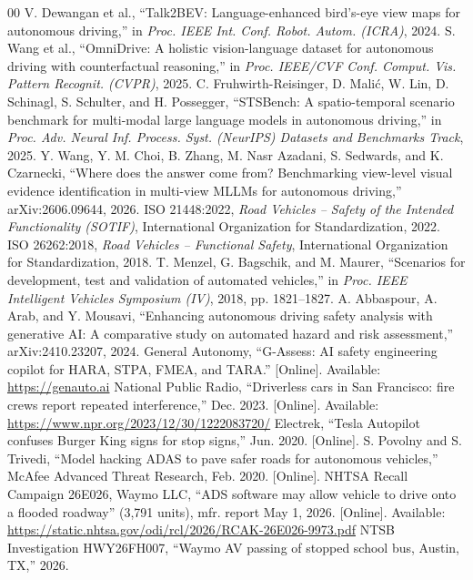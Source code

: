 \documentclass[conference]{IEEEtran}
\begin{document}
\begin{thebibliography}{00}
 V. Dewangan et al., ``Talk2BEV: Language-enhanced bird's-eye view maps for autonomous driving,'' in \emph{Proc. IEEE Int. Conf. Robot. Autom. (ICRA)}, 2024.
 S. Wang et al., ``OmniDrive: A holistic vision-language dataset for autonomous driving with counterfactual reasoning,'' in \emph{Proc. IEEE/CVF Conf. Comput. Vis. Pattern Recognit. (CVPR)}, 2025.
 C. Fruhwirth-Reisinger, D. Mali\'{c}, W. Lin, D. Schinagl, S. Schulter, and H. Possegger, ``STSBench: A spatio-temporal scenario benchmark for multi-modal large language models in autonomous driving,'' in \emph{Proc. Adv. Neural Inf. Process. Syst. (NeurIPS) Datasets and Benchmarks Track}, 2025.
 Y. Wang, Y. M. Choi, B. Zhang, M. Nasr Azadani, S. Sedwards, and K. Czarnecki, ``Where does the answer come from? Benchmarking view-level visual evidence identification in multi-view MLLMs for autonomous driving,'' arXiv:2606.09644, 2026.
 ISO 21448:2022, \emph{Road Vehicles -- Safety of the Intended Functionality (SOTIF)}, International Organization for Standardization, 2022.
 ISO 26262:2018, \emph{Road Vehicles -- Functional Safety}, International Organization for Standardization, 2018.
 T. Menzel, G. Bagschik, and M. Maurer, ``Scenarios for development, test and validation of automated vehicles,'' in \emph{Proc. IEEE Intelligent Vehicles Symposium (IV)}, 2018, pp. 1821--1827.
 A. Abbaspour, A. Arab, and Y. Mousavi, ``Enhancing autonomous driving safety analysis with generative AI: A comparative study on automated hazard and risk assessment,'' arXiv:2410.23207, 2024.
 General Autonomy, ``G-Assess: AI safety engineering copilot for HARA, STPA, FMEA, and TARA.'' [Online]. Available: \url{https://genauto.ai}
 National Public Radio, ``Driverless cars in San Francisco: fire crews report repeated interference,'' Dec. 2023. [Online]. Available: \url{https://www.npr.org/2023/12/30/1222083720/}
 Electrek, ``Tesla Autopilot confuses Burger King signs for stop signs,'' Jun. 2020. [Online].
 S. Povolny and S. Trivedi, ``Model hacking ADAS to pave safer roads for autonomous vehicles,'' McAfee Advanced Threat Research, Feb. 2020. [Online].
 NHTSA Recall Campaign 26E026, Waymo LLC, ``ADS software may allow vehicle to drive onto a flooded roadway'' (3,791 units), mfr. report May 1, 2026. [Online]. Available: \url{https://static.nhtsa.gov/odi/rcl/2026/RCAK-26E026-9973.pdf}
 NTSB Investigation HWY26FH007, ``Waymo AV passing of stopped school bus, Austin, TX,'' 2026.

\end{thebibliography}
\end{document}
